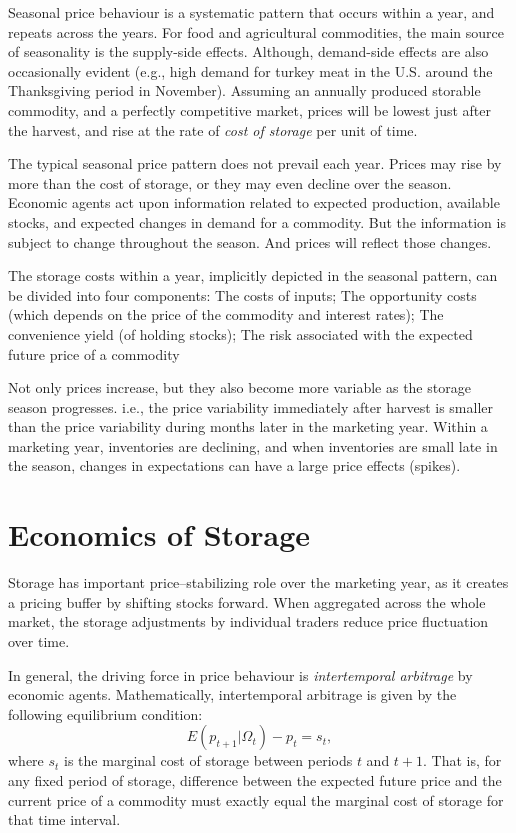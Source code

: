 \documentclass[
]{book}
\begin{document}
Seasonal price behaviour is a systematic pattern that occurs within a year, and repeats across the years. For food and agricultural commodities, the main source of seasonality is the supply-side effects. Although, demand-side effects are also occasionally evident (e.g., high demand for turkey meat in the U.S. around the Thanksgiving period in November). Assuming an annually produced storable commodity, and a perfectly competitive market, prices will be lowest just after the harvest, and rise at the rate of \emph{cost of storage} per unit of time.

The typical seasonal price pattern does not prevail each year. Prices may rise by more than the cost of storage, or they may even decline over the season. Economic agents act upon information related to expected production, available stocks, and expected changes in demand for a commodity. But the information is subject to change throughout the season. And prices will reflect those changes.

The storage costs within a year, implicitly depicted in the seasonal pattern, can be divided into four components: The costs of inputs; The opportunity costs (which depends on the price of the commodity and interest rates); The convenience yield (of holding stocks); The risk associated with the expected future price of a commodity

Not only prices increase, but they also become more variable as the storage season progresses. i.e., the price variability immediately after harvest is smaller than the price variability during months later in the marketing year. Within a marketing year, inventories are declining, and when inventories are small late in the season, changes in expectations can have a large price effects (spikes).

\hypertarget{economics-of-storage}{%
\section{Economics of Storage}\label{economics-of-storage}}

Storage has important price--stabilizing role over the marketing year, as it creates a pricing buffer by shifting stocks forward. When aggregated across the whole market, the storage adjustments by individual traders reduce price fluctuation over time.

In general, the driving force in price behaviour is \emph{intertemporal arbitrage} by economic agents. Mathematically, intertemporal arbitrage is given by the following equilibrium condition: \[E\left(p_{t+1}|\Omega_t\right)-p_{t} = s_t,\] where \(s_t\) is the marginal cost of storage between periods \(t\) and \(t+1\). That is, for any fixed period of storage, difference between the expected future price and the current price of a commodity must exactly equal the marginal cost of storage for that time interval.
\end{document}
